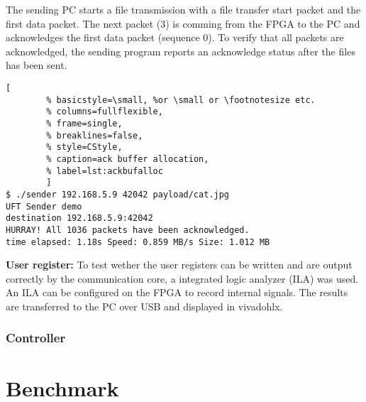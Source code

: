 The sending PC starts a file transmission with a file transfer start packet and
the first data packet. The next packet (3) is comming from the FPGA to the PC
and acknowledges the first data packet (sequence 0). To verify that all packets
are acknowledged, the sending program reports an acknowledge status after the
files has been sent. 

\begin{minipage}{\linewidth}
    \begin{lstlisting}[
        % basicstyle=\small, %or \small or \footnotesize etc.
        % columns=fullflexible,
        % frame=single,
        % breaklines=false,
        % style=CStyle, 
        % caption=ack buffer allocation, 
        % label=lst:ackbufalloc
        ]
$ ./sender 192.168.5.9 42042 payload/cat.jpg
UFT Sender demo
destination 192.168.5.9:42042
HURRAY! All 1036 packets have been acknowledged.
time elapsed: 1.18s Speed: 0.859 MB/s Size: 1.012 MB\end{lstlisting}
\end{minipage}

\vspace{1ex}
\textbf{User register:} To test wether the user registers can be written and are
output correctly by the communication core, a integrated logic analyzer (ILA)
was used. An ILA can be configured on the FPGA to record internal signals. The
results are transferred to the PC over USB and displayed in \gls{vivadohlx}. 


\subsubsection*{Controller}

%
%
\section{Benchmark}\label{ch:benchmark}

